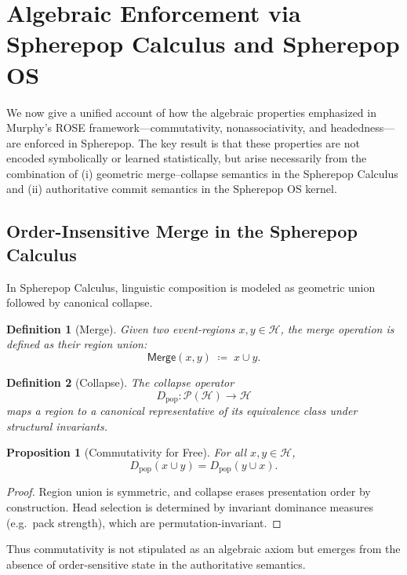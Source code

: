 \documentclass[11pt]{article}
\newtheorem{definition}{Definition}
\newtheorem{proposition}{Proposition}
\begin{document}
\section{Algebraic Enforcement via Spherepop Calculus and Spherepop OS}
\label{sec:spherepop_algebra}

We now give a unified account of how the algebraic properties emphasized in Murphy’s ROSE framework—commutativity, nonassociativity, and headedness—are enforced in Spherepop. The key result is that these properties are not encoded symbolically or learned statistically, but arise necessarily from the combination of (i) geometric merge--collapse semantics in the Spherepop Calculus and (ii) authoritative commit semantics in the Spherepop OS kernel.

\subsection{Order-Insensitive Merge in the Spherepop Calculus}

In Spherepop Calculus, linguistic composition is modeled as geometric union followed by canonical collapse.

\begin{definition}[Merge]
Given two event-regions $x,y \in \mathcal{H}$, the \emph{merge} operation is defined as their region union:
\[
\mathsf{Merge}(x,y) \;\coloneqq\; x \cup y.
\]
\end{definition}

\begin{definition}[Collapse]
The \emph{collapse} operator
\[
D_{\mathrm{pop}} : \mathcal{P}(\mathcal{H}) \to \mathcal{H}
\]
maps a region to a canonical representative of its equivalence class under structural invariants.
\end{definition}

\begin{proposition}[Commutativity for Free]
\label{prop:sp_comm}
For all $x,y \in \mathcal{H}$,
\[
D_{\mathrm{pop}}(x \cup y) = D_{\mathrm{pop}}(y \cup x).
\]
\end{proposition}

\begin{proof}
Region union is symmetric, and collapse erases presentation order by construction. Head selection is determined by invariant dominance measures (e.g.\ pack strength), which are permutation-invariant.
\end{proof}

Thus commutativity is not stipulated as an algebraic axiom but emerges from the absence of order-sensitive state in the authoritative semantics.
\end{document}
